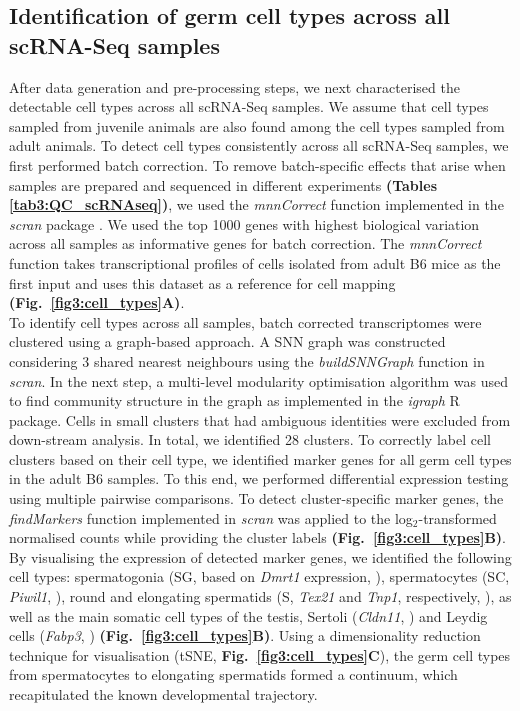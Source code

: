 \newpage

\subsection{Identification of germ cell types across all scRNA-Seq samples}
\label{sec3:clustering}

After data generation and pre-processing steps, we next characterised the detectable cell types across all scRNA-Seq samples. 
We assume that cell types sampled from juvenile animals are also found among the cell types sampled from adult animals. 
To detect cell types consistently across all scRNA-Seq samples, we first performed batch correction. 
To remove batch-specific effects that arise when samples are prepared and sequenced in different experiments \textbf{(Tables \ref{tab3:QC_scRNAseq})}, we used the \emph{mnnCorrect} function implemented in the \emph{scran} package \citep{Haghverdi2018}. 
We used the top 1000 genes with highest biological variation across all samples as informative genes for batch correction. 
The \emph{mnnCorrect} function takes transcriptional profiles of cells isolated from adult B6 mice as the first input and uses this dataset as a reference for cell mapping \textbf{(Fig.~\ref{fig3:cell_types}A)}.\\

To identify cell types across all samples, batch corrected transcriptomes were clustered using a graph-based approach. 
A \gls{SNN} graph \citep{Xu2015} was constructed considering 3 shared nearest neighbours using the \emph{buildSNNGraph} function in \emph{scran}. 
In the next step, a multi-level modularity optimisation algorithm was used to find community structure in the graph \citep{Blondel2008} as implemented in the \emph{igraph} R package. 
Cells in small clusters that had ambiguous identities were excluded from down-stream analysis. 
In total, we identified 28 clusters. To correctly label cell clusters based on their cell type, we identified marker genes for all germ cell types in the adult B6 samples. 
To this end, we performed differential expression testing using multiple pairwise comparisons. 
To detect cluster-specific marker genes, the \emph{findMarkers} function implemented in \emph{scran} was applied to the log$_2$-transformed normalised counts while providing the cluster labels \textbf{(Fig.~\ref{fig3:cell_types}B)}. \\

By visualising the expression of detected marker genes, we identified the following cell types: spermatogonia (SG, based on \textit{Dmrt1} expression, \citep{Matson2010}), spermatocytes (SC, \textit{Piwil1}, \citep{Deng2002}), round and elongating spermatids (S, \textit{Tex21} and \textit{Tnp1}, respectively, \citep{Fujii2002}), as well as the main somatic cell types of the testis, Sertoli (\textit{Cldn11}, \citep{Mazaud-Guittot2010}) and Leydig cells (\textit{Fabp3}, \citep{Oresti2013}) \textbf{(Fig.~\ref{fig3:cell_types}B)}. 
Using a dimensionality reduction technique for visualisation (tSNE, \textbf{Fig.~\ref{fig3:cell_types}C}), the germ cell types from spermatocytes to elongating spermatids formed a continuum, which recapitulated the known developmental trajectory.

